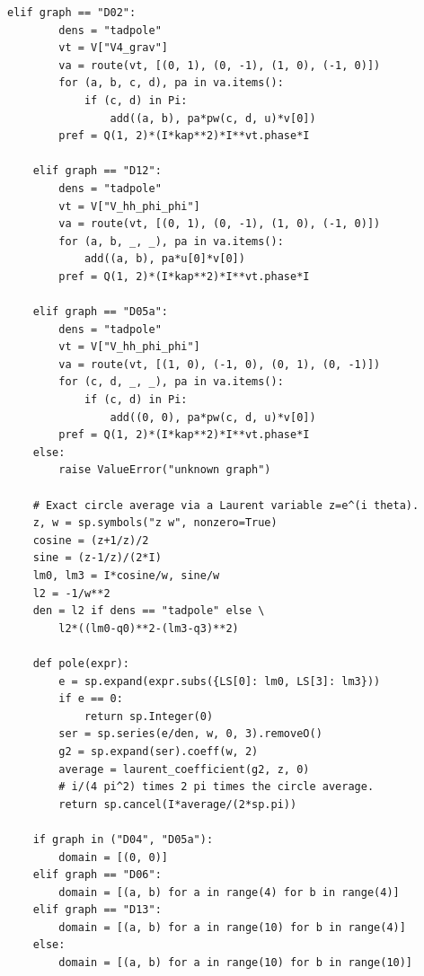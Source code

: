 \documentclass[11pt,a4paper]{article}
\theoremstyle{plain}
\theoremstyle{definition}
\theoremstyle{remark}
\numberwithin{equation}{section}
\begin{document}
\begin{lstlisting}[caption={Consolidated exact checker and coverage-aware optional replay.},
                  label={lst:program}]
    elif graph == "D02":
        dens = "tadpole"
        vt = V["V4_grav"]
        va = route(vt, [(0, 1), (0, -1), (1, 0), (-1, 0)])
        for (a, b, c, d), pa in va.items():
            if (c, d) in Pi:
                add((a, b), pa*pw(c, d, u)*v[0])
        pref = Q(1, 2)*(I*kap**2)*I**vt.phase*I

    elif graph == "D12":
        dens = "tadpole"
        vt = V["V_hh_phi_phi"]
        va = route(vt, [(0, 1), (0, -1), (1, 0), (-1, 0)])
        for (a, b, _, _), pa in va.items():
            add((a, b), pa*u[0]*v[0])
        pref = Q(1, 2)*(I*kap**2)*I**vt.phase*I

    elif graph == "D05a":
        dens = "tadpole"
        vt = V["V_hh_phi_phi"]
        va = route(vt, [(1, 0), (-1, 0), (0, 1), (0, -1)])
        for (c, d, _, _), pa in va.items():
            if (c, d) in Pi:
                add((0, 0), pa*pw(c, d, u)*v[0])
        pref = Q(1, 2)*(I*kap**2)*I**vt.phase*I
    else:
        raise ValueError("unknown graph")

    # Exact circle average via a Laurent variable z=e^(i theta).
    z, w = sp.symbols("z w", nonzero=True)
    cosine = (z+1/z)/2
    sine = (z-1/z)/(2*I)
    lm0, lm3 = I*cosine/w, sine/w
    l2 = -1/w**2
    den = l2 if dens == "tadpole" else \
        l2*((lm0-q0)**2-(lm3-q3)**2)

    def pole(expr):
        e = sp.expand(expr.subs({LS[0]: lm0, LS[3]: lm3}))
        if e == 0:
            return sp.Integer(0)
        ser = sp.series(e/den, w, 0, 3).removeO()
        g2 = sp.expand(ser).coeff(w, 2)
        average = laurent_coefficient(g2, z, 0)
        # i/(4 pi^2) times 2 pi times the circle average.
        return sp.cancel(I*average/(2*sp.pi))

    if graph in ("D04", "D05a"):
        domain = [(0, 0)]
    elif graph == "D06":
        domain = [(a, b) for a in range(4) for b in range(4)]
    elif graph == "D13":
        domain = [(a, b) for a in range(10) for b in range(4)]
    else:
        domain = [(a, b) for a in range(10) for b in range(10)]


\end{lstlisting}
\end{document}
